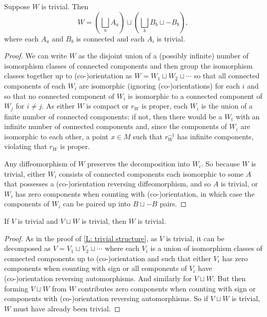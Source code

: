 \begin{lemma}\label{L: trivial structure}
	Suppose $W$ is trivial.
	Then
	$$W = \left(\bigsqcup_a A_a \right) \sqcup \left(\bigsqcup_b B_b \sqcup -B_b \right),$$
	where each $A_a$ and $B_b$ is connected and each $A_i$ is trivial.
\end{lemma}
\begin{proof}
	We can write $W$ as the disjoint union of a (possibly infinite) number of isomorphism classes of connected components and then group the isomorphism classes together up to (co\nobreakdash-)orientation as $W = W_1 \sqcup W_2 \sqcup \cdots$ so that all connected components of each $W_i$ are isomorphic (ignoring (co\nobreakdash-)orientations) for each $i$ and so that no connected component of $W_i$ is isomorphic to a connected component of $W_j$ for $i\neq j$.
	As either $W$ is compact or $r_W$ is proper, each $W_i$ is the union of a finite number of connected components; if not, then there would be a $W_i$ with an infinite number of connected components and, since the components of $W_i$ are isomorphic to each other, a point $x\in M$ such that $r_W^{-1}$ has infinite components, violating that $r_W$ is proper.

	Any diffeomorphism of $W$ preserves the decomposition into $W_i$.
	So because $W$ is trivial, either $W_i$ consists of connected components each isomorphic to some $A$  that possesses a (co\nobreakdash-)orientation reversing diffeomorphism, and so $A$ is trivial, or $W_i$ has zero components when counting with (co\nobreakdash-)orientation, in which case the components of $W_i$ can be paired up into $B \sqcup -B$ pairs.
\end{proof}

\begin{lemma}\label{L: Lip L10}
	If $V$ is trivial and $V \sqcup W$ is trivial, then $W$ is trivial.
\end{lemma}
\begin{proof}
	As in the proof of \cref{L: trivial structure}, as $V$ is trivial, it can be decomposed as $V = V_1 \sqcup V_2 \sqcup \cdots$ where each $V_i$ is a union of isomorphism classes of connected components up to (co\nobreakdash-)orienta\-tion and such that either $V_i$ has zero components when counting with sign or all components of $V_i$ have (co\nobreakdash-)orientation reversing automorphisms.
	And similarly for $V \sqcup W$.
	But then forming $V \sqcup W$ from $W$ contributes zero components when counting with sign or components with (co\nobreakdash-)orientation reversing automorphisms.
	So if $V \sqcup W$ is trivial, $W$ must have already been trivial.
\end{proof}

